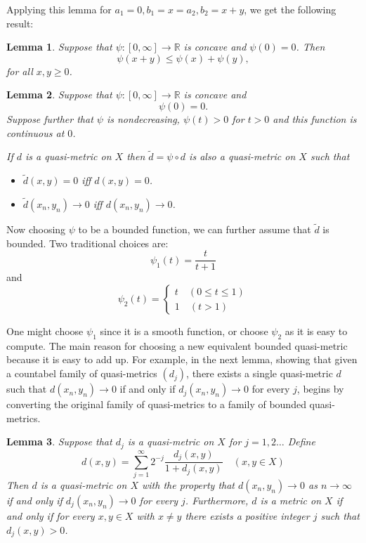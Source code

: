 \documentclass{article} %
\newtheorem{lemma}{Lemma}
\begin{document}
Applying this lemma for $a_1 =0, b_1=x = a_2, b_2=x+y$, we get the following result:
\begin{lemma}
    Suppose that $\psi \colon [0,\infty] \to \mathbb{R}$ is concave and $\psi(0)=0$. Then
    \[ \psi(x+y) \le \psi(x) + \psi(y),\]
    for all $x,y \ge 0$.
\end{lemma}
\begin{lemma}
    Suppose that $\psi \colon [0,\infty] \to \mathbb{R}$ is concave and
    \[\psi(0)=0.\]
    Suppose further that $\psi$ is nondecreasing, $\psi(t) >0$ for $t >0$ and this function is continuous at $0$.

    If $d$ is a quasi-metric on $X$ then $\tilde{d} = \psi \circ d$ is also a quasi-metric on $X$
    such that
    \begin{itemize}
        \item $\tilde{d}(x,y)=0$ iff $d(x,y)=0$.
        \item $\tilde{d}(x_n,y_n) \to 0$ iff $d(x_n,y_n) \to 0$.
    \end{itemize}
\end{lemma}
Now choosing $\psi$ to be a bounded function, we can further assume that $\tilde{d}$ is bounded. Two traditional choices are:
\[ \psi_1(t)= \dfrac{t}{t+1}\]
and
\[\psi_2(t) = \begin{cases}
        t \quad (0 \le t \le 1) \\
        1 \quad (t >1)
    \end{cases}\]

One might choose $\psi_1$ since it is a smooth function, or choose $\psi_2$ as it is easy to compute.
The main reason for choosing a new equivalent bounded quasi-metric because it is easy to add up.
For example, in the next lemma, showing that given a countabel family of quasi-metrics $(d_j)$, there exists a single quasi-metric $d$
such that $d(x_n,y_n) \to 0$  if and only if $d_j(x_n,y_n) \to 0$ for every $j$, begins by converting the original family of quasi-metrics to a family of bounded quasi-metrics.

\begin{lemma}
    Suppose that $d_j$ is a quasi-metric on $X$ for $j =1,2\ldots$ Define
    \[d(x,y) = \sum_{j=1}^\infty 2^{-j}\dfrac{d_j(x,y)}{1+d_j(x,y)} \quad (x,y \in X)\]
    Then $d$ is a quasi-metric on $X$ with the property that $d(x_n,y_n) \to 0$ as $n \to \infty$
    if and only if $d_j(x_n,y_n) \to 0$ for every $j$.
    Furthermore, $d$ is a metric on $X$ if and only if for every $x,y \in X$ with $x \ne y$ there exists a positive integer $j$ such that $d_j(x,y)>0$.
\end{lemma}
\end{document}
